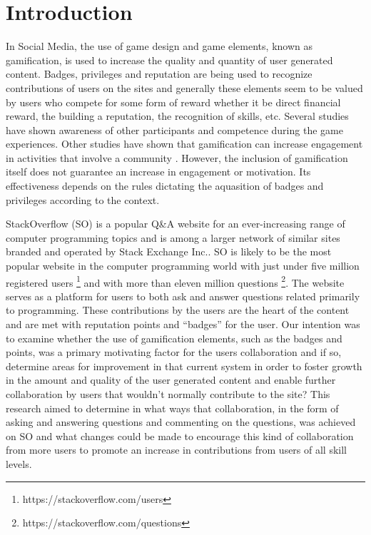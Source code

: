 \documentclass{sigchi}
\begin{document}

 

\section{Introduction}
In Social Media, the use of game design and game elements, known as gamification, is used to increase the quality and quantity of user generated content. Badges, privileges and reputation are being used to recognize contributions of users on the sites and generally these elements seem to be valued by users who compete for some form of reward whether it be direct financial reward, the building a reputation, the recognition of skills, etc. Several studies have shown awareness of other participants and competence during the game experiences\cite{Rughinis}. Other studies have shown that gamification can increase engagement in activities that involve a community \cite{Marder}. However, the inclusion of gamification itself does not guarantee an increase in engagement or motivation. Its effectiveness depends on the rules dictating the aquasition of badges and privileges according to the context\cite{Deterding}.


StackOverflow (SO) is a popular Q\&A website for an ever-increasing range of computer programming topics and is among a larger network of similar sites branded and operated by Stack Exchange Inc.. SO is likely to be the most popular website in the computer programming world with just under five million registered users \footnote{https://stackoverflow.com/users} and with more than eleven million questions \footnote{https://stackoverflow.com/questions}. The website serves as a platform for users to both ask and answer questions related primarily to programming. These contributions by the users are the heart of the content and are met with reputation points and “badges” for the user. Our intention was to examine whether the use of gamification elements, such as the badges and points, was a primary motivating factor for the users collaboration and if so, determine areas for improvement in that current system in order to foster growth in the amount and quality of the user generated content and enable further collaboration by users that wouldn't normally contribute to the site?
This research aimed to determine in what ways that collaboration, in the form of asking and answering questions and commenting on the questions, was achieved on SO and what changes could be made to encourage this kind of collaboration from more users to promote an increase in contributions from users of all skill levels.
\end{document}

